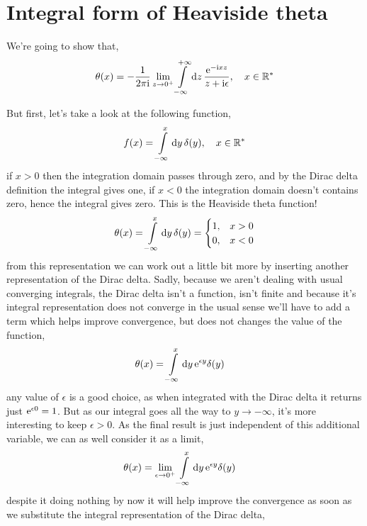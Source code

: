 \section{Integral form of Heaviside theta}
\label{appendix:heaviside}

We're going to show that,
\begin{align}
    \theta\qty(x) = -\frac{1}{2\pi\textnormal{i}}\lim\limits_{z\rightarrow0^+}\int\limits_{-\infty}^{+\infty}\dd{z}\frac{\textnormal{e}^{-\textnormal{i} x z}}{z+\textnormal{i}\epsilon},\ \ \ x\in\mathbb R^*
\end{align}

But first, let's take a look at the following function,
\begin{align}
    f\qty(x)=\int\limits_{-\infty}^{x}\dd{y}\delta\qty(y),\ \ \ x\in\mathbb R^*
\end{align}
if $x>0$ then the integration domain passes through zero, and by the Dirac delta definition the integral gives one, if $x<0$ the integration domain 
doesn't contains zero, hence the integral gives zero. This is the Heaviside theta function!
\begin{align}
   \theta\qty(x)=\int\limits_{-\infty}^{x}\dd{y}\delta\qty(y)=\begin{cases}1,&x>0\\0,&x<0\end{cases}
\end{align}
from this representation we can work out a little bit more by inserting another representation of the Dirac delta. Sadly, because we aren't dealing with usual converging integrals, 
the Dirac delta isn't a function, isn't finite and because it's integral representation does not converge in the usual sense we'll have to add a term which helps improve convergence, 
but does not changes the value of the function,
\begin{align}
   \theta\qty(x)&=\int\limits_{-\infty}^{x}\dd{y}\textnormal{e}^{\epsilon y}\delta\qty(y)
\end{align}
any value of $\epsilon$ is a good choice, as when integrated with the Dirac delta it returns just $\textnormal{e}^{\epsilon 0} =1 $. But as our integral goes all the way to $y\rightarrow-\infty$, 
it's more interesting to keep $\epsilon>0$. As the final result is just independent of this additional variable, we can as well consider it as a limit,
\begin{align}
   \theta\qty(x)&=\lim\limits_{\epsilon\rightarrow0^+}\int\limits_{-\infty}^{x}\dd{y}\textnormal{e}^{\epsilon y}\delta\qty(y)
\end{align}
despite it doing nothing by now it will help improve the convergence as soon as we substitute the integral representation of the Dirac delta,
